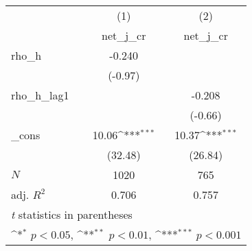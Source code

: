 {
\def\sym#1{\ifmmode^{#1}\else\(^{#1}\)\fi}
\begin{tabular}{l*{2}{c}}
\toprule
            &\multicolumn{1}{c}{(1)}&\multicolumn{1}{c}{(2)}\\
            &\multicolumn{1}{c}{net\_j\_cr}&\multicolumn{1}{c}{net\_j\_cr}\\
\midrule
rho\_h       &      -0.240         &                     \\
            &     (-0.97)         &                     \\
\addlinespace
rho\_h\_lag1  &                     &      -0.208         \\
            &                     &     (-0.66)         \\
\addlinespace
\_cons      &       10.06\sym{***}&       10.37\sym{***}\\
            &     (32.48)         &     (26.84)         \\
\midrule
\(N\)       &        1020         &         765         \\
adj. \(R^{2}\)&       0.706         &       0.757         \\
\bottomrule
\multicolumn{3}{l}{\footnotesize \textit{t} statistics in parentheses}\\
\multicolumn{3}{l}{\footnotesize \sym{*} \(p<0.05\), \sym{**} \(p<0.01\), \sym{***} \(p<0.001\)}\\
\end{tabular}
}
